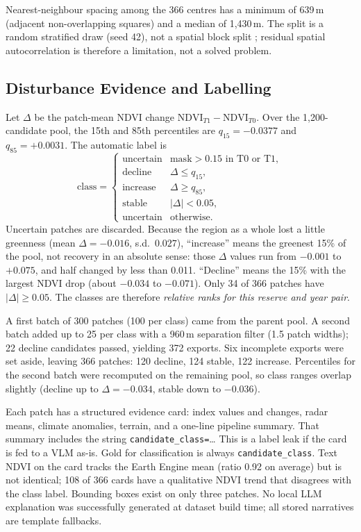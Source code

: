 \documentclass[11pt]{article}
\begin{document}
Nearest-neighbour spacing among the 366 centres has a minimum of
639\,m (adjacent non-overlapping squares) and a median of 1,430\,m.
The split is a random stratified draw (seed 42), not a spatial block
split \citep{ploton2020}; residual spatial autocorrelation is therefore
a limitation, not a solved problem.

\subsection{Disturbance Evidence and Labelling}

Let $\Delta$ be the patch-mean NDVI change $\mathrm{NDVI}_{T1}-\mathrm{NDVI}_{T0}$.
Over the 1,200-candidate pool, the 15th and 85th percentiles are
$q_{15}=-0.0377$ and $q_{85}=+0.0031$. The automatic label is
\begin{equation}
\mathrm{class} =
\begin{cases}
\text{uncertain} & \text{mask}>0.15 \text{ in T0 or T1},\\
\text{decline} & \Delta \le q_{15},\\
\text{increase} & \Delta \ge q_{85},\\
\text{stable} & |\Delta|<0.05,\\
\text{uncertain} & \text{otherwise}.
\end{cases}
\end{equation}
Uncertain patches are discarded. Because the region as a whole lost a
little greenness (mean $\Delta=-0.016$, s.d.\ $0.027$), ``increase''
means the greenest 15\% of the pool, not recovery in an absolute
sense: those $\Delta$ values run from $-0.001$ to $+0.075$, and half
changed by less than 0.011. ``Decline'' means the 15\% with the
largest NDVI drop (about $-0.034$ to $-0.071$). Only 34 of 366
patches have $|\Delta|\ge 0.05$. The classes are therefore
\emph{relative ranks for this reserve and year pair}.

A first batch of 300 patches (100 per class) came from the parent
pool. A second batch added up to 25 per class with a 960\,m separation
filter (1.5 patch widths); 22 decline candidates passed, yielding 372
exports. Six incomplete exports were set aside, leaving 366 patches:
120 decline, 124 stable, 122 increase. Percentiles for the second
batch were recomputed on the remaining pool, so class ranges overlap
slightly (decline up to $\Delta=-0.034$, stable down to $-0.036$).

Each patch has a structured evidence card: index values and changes,
radar means, climate anomalies, terrain, and a one-line pipeline
summary. That summary includes the string
\texttt{candidate\_class=}\ldots{} This is a label leak if the card is
fed to a VLM as-is. Gold for classification is always
\texttt{candidate\_class}. Text NDVI on the card tracks the Earth
Engine mean (ratio 0.92 on average) but is not identical; 108 of 366
cards have a qualitative NDVI trend that disagrees with the class
label. Bounding boxes exist on only three patches. No local LLM
explanation was successfully generated at dataset build time; all
stored narratives are template fallbacks.
\end{document}
